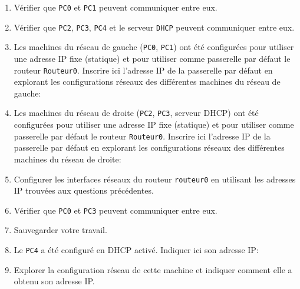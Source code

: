 \documentclass[a4paper,10pt]{report}
\begin{document}
\begin{Form}
\begin{enumerate}
    \item Vérifier que \verb|PC0| et \verb|PC1| peuvent communiquer entre eux. 
    \item Vérifier que \verb|PC2|, \verb|PC3|, \verb|PC4| et le serveur \verb|DHCP| peuvent communiquer entre eux. 
    \item Les machines du réseau de gauche (\verb|PC0|, \verb|PC1|) ont été configurées pour utiliser une adresse IP fixe (statique) et pour utiliser comme passerelle par défaut le routeur \verb|Routeur0|. Inscrire ici l'adresse IP de la passerelle par défaut en explorant les configurations réseaux des différentes machines du réseau de gauche: \smallfield{}\hfill \Bareme{} 
    \item Les machines du réseau de droite (\verb|PC2|, \verb|PC3|, serveur DHCP) ont été configurées pour utiliser une adresse IP fixe (statique) et pour utiliser comme passerelle par défaut le routeur \verb|Routeur0|. Inscrire ici l'adresse IP de la passerelle par défaut en explorant les configurations réseaux des différentes machines du réseau de droite: \smallfield{}\hfill \Bareme{} 
    \item Configurer les interfaces réseaux du routeur \verb|routeur0| en utilisant les adresses IP trouvées aux questions précédentes.
    \item Vérifier que \verb|PC0| et \verb|PC3| peuvent communiquer entre eux.\hfill \Bareme{} 
    \item Sauvegarder votre travail.
    
    \medskip

    \item Le \verb|PC4| a été configuré en DHCP activé. Indiquer ici son adresse IP: \smallfield{}\hfill \Bareme{} 
    \item Explorer la configuration réseau de cette machine et indiquer comment elle a obtenu son adresse IP.\hfill \Bareme{} 
    
    \longfield{4.5cm}
  

\end{enumerate}

\medskip



\end{Form}
\end{document}
